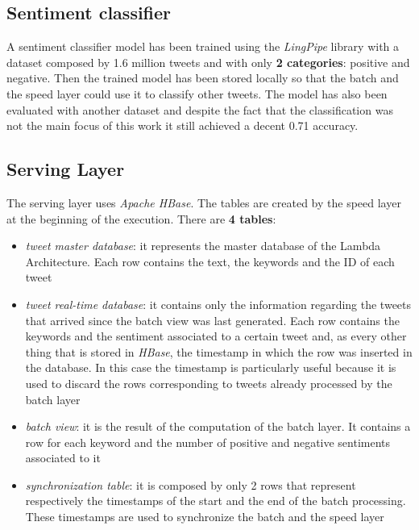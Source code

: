 \documentclass[10pt,twocolumn,letterpaper]{article}
\begin{document}

\subsection{Sentiment classifier}
A sentiment classifier model has been trained using the \emph{LingPipe} library \cite{LingPipe} with a dataset \cite{go2009twitter} composed by 1.6 million tweets and with only \textbf{2 categories}: positive and negative. Then the trained model has been stored locally so that the batch and the speed layer could use it to classify other tweets. The model has also been evaluated with another dataset \cite{guyzGithubDataset} and despite the fact that the classification was not the main focus of this work it still achieved a decent 0.71 accuracy.


\subsection{Serving Layer}
The serving layer uses \emph{Apache HBase}. The tables are created by the speed layer at the beginning of the execution. There are \textbf{4 tables}:
\begin{itemize}
\item \emph{tweet master database}: it represents the master database of the Lambda Architecture. Each row contains the text, the keywords and the ID of each tweet
\item \emph{tweet real-time database}: it contains only the information regarding the tweets that arrived since the batch view was last generated. Each row contains the keywords and the sentiment associated to a certain tweet and, as every other thing that is stored in \emph{HBase}, the timestamp in which the row was inserted in the database. In this case the timestamp is particularly useful because it is used to discard the rows corresponding to tweets already processed by the batch layer
\item \emph{batch view}: it is the result of the computation of the batch layer. It contains a row for each keyword and the number of positive and negative sentiments associated to it
\item \emph{synchronization table}: it is composed by only 2 rows that represent respectively the timestamps of the start and the end of the batch processing. These timestamps are used to synchronize the batch and the speed layer
\end{itemize}
\end{document}
